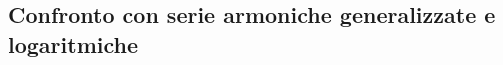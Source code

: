 \subsection{Confronto con serie armoniche generalizzate e logaritmiche}
\label{sec:esercizi-serie-serie-armoniche-generalizzate-e-logaritmi}
